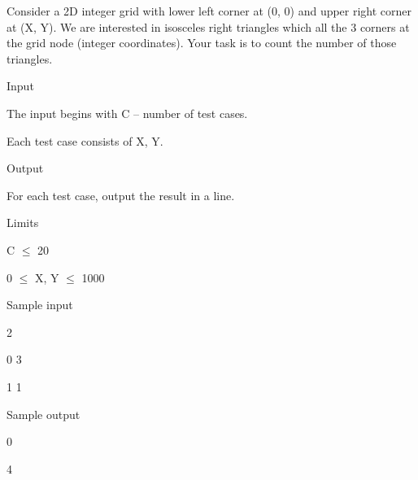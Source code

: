



   Consider a 2D integer grid with lower left corner at (0, 0) and upper right corner at (X, Y). We are interested in isosceles right triangles which all the 3 corners at the grid node (integer coordinates). Your task is to count the number of those triangles.  




   Input   


   The input begins with C – number of test cases.   


   Each test case consists of X, Y.  




   Output   


   For each test case, output the result in a line.  




   Limits   


   C  $\le$  20   


   0  $\le$  X, Y  $\le$  1000  




   Sample input   


   2   


   0 3   


   1 1  




   Sample output   


   0   


   4  
